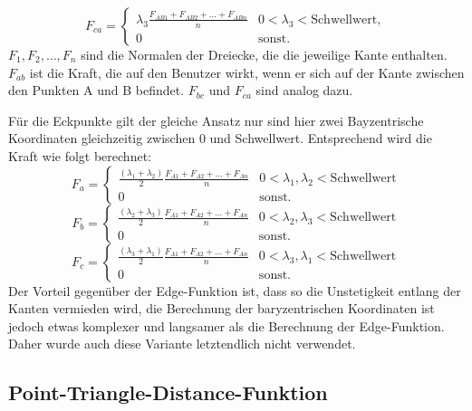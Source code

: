 \documentclass[conference]{IEEEtran}
\begin{document}
\begin{equation*}
    F_{ca} =
    \begin{cases} 
        \lambda_3 \frac{{ F_{AB1} + F_{AB2} + \ldots + F_{ABn}}}{n} &  0 < \lambda_3 < \text{Schwellwert}, \\
        0 & \text{sonst.}
    \end{cases}
\end{equation*}
$F_1, F_2, \ldots, F_n$ sind die Normalen der Dreiecke, die die jeweilige Kante enthalten. $F_{ab}$ ist die Kraft, die auf den Benutzer wirkt, wenn er sich auf der Kante zwischen den Punkten A und B befindet. $F_{bc}$ und $F_{ca}$ sind analog dazu.

Für die Eckpunkte gilt der gleiche Ansatz nur sind hier zwei Bayzentrische Koordinaten gleichzeitig zwischen 0 und Schwellwert. Entsprechend wird die Kraft wie folgt berechnet:
\begin{equation*}
    F_{a} = 
    \begin{cases} 
        \frac{(\lambda_1 + \lambda_2)}{2} \frac{{ F_{A1} + F_{A2} + \ldots + F_{An}}}{n} &  0 < \lambda_1, \lambda_2 < \text{Schwellwert} \\
        0 & \text{sonst.}
    \end{cases}
\end{equation*} 
\begin{equation*}
    F_{b} = 
    \begin{cases} 
        \frac{(\lambda_2 + \lambda_3)}{2} \frac{{ F_{A1} + F_{A2} + \ldots + F_{An}}}{n} &  0 < \lambda_2, \lambda_3 < \text{Schwellwert} \\
        0 & \text{sonst.}
    \end{cases}
\end{equation*} 
\begin{equation*}
    F_{c} = 
    \begin{cases} 
        \frac{(\lambda_3 + \lambda_1)}{2} \frac{{ F_{A1} + F_{A2} + \ldots + F_{An}}}{n} &  0 < \lambda_3, \lambda_1 < \text{Schwellwert} \\
        0 & \text{sonst.}
    \end{cases}
\end{equation*} 
Der Vorteil gegenüber der Edge-Funktion ist, dass so die Unstetigkeit entlang der Kanten vermieden wird, die Berechnung der baryzentrischen Koordinaten ist jedoch etwas komplexer und langsamer als die Berechnung der Edge-Funktion. Daher wurde auch diese Variante letztendlich nicht verwendet.

\subsection{Point-Triangle-Distance-Funktion}
\end{document}
